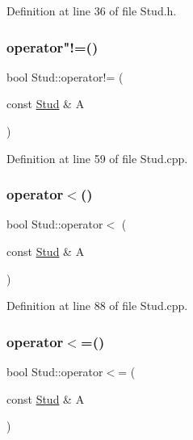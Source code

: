 Definition at line 36 of file Stud.\+h.

\mbox{\label{class_stud_a6b08af30aac6482b43624c17da099e2f}} 
\subsubsection{\texorpdfstring{operator"!=()}{operator!=()}}
{\footnotesize\ttfamily bool Stud\+::operator!= (\begin{DoxyParamCaption}\item[{const \mbox{\hyperlink{class_stud}{Stud}} \&}]{A }\end{DoxyParamCaption})}



Definition at line 59 of file Stud.\+cpp.

\mbox{\label{class_stud_aeb5b71435c3d09d857894b3d6048c013}} 
\subsubsection{\texorpdfstring{operator$<$()}{operator<()}}
{\footnotesize\ttfamily bool Stud\+::operator$<$ (\begin{DoxyParamCaption}\item[{const \mbox{\hyperlink{class_stud}{Stud}} \&}]{A }\end{DoxyParamCaption})}



Definition at line 88 of file Stud.\+cpp.

\mbox{\label{class_stud_adc0b5c12c3c26fdc2c0baaba9df2619c}} 
\subsubsection{\texorpdfstring{operator$<$=()}{operator<=()}}
{\footnotesize\ttfamily bool Stud\+::operator$<$= (\begin{DoxyParamCaption}\item[{const \mbox{\hyperlink{class_stud}{Stud}} \&}]{A }\end{DoxyParamCaption})}



